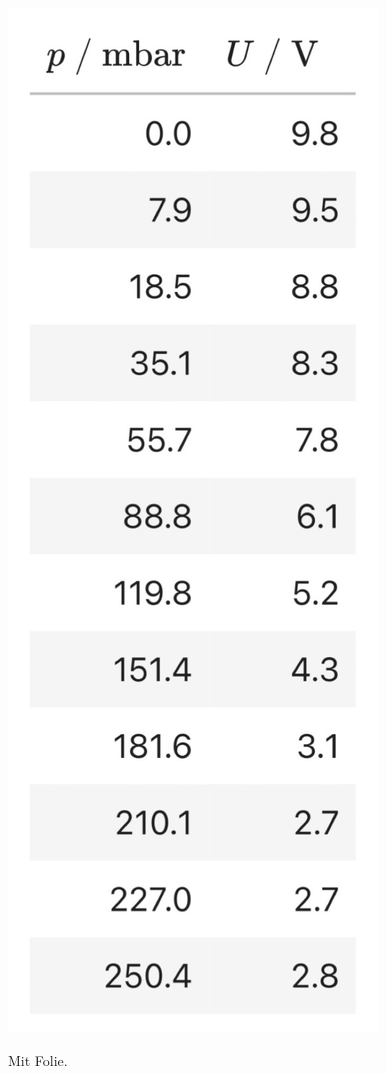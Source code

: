 \begin{table}[H]
\begin{subfigure}{0.18\textwidth}
    	\label{tab:OhneFolie}
	\end{subfigure}
	\hfill
	\begin{subfigure}{0.18\textwidth}
    	\centering
    	\caption{Mit Folie.}
    	\includegraphics[width=\textwidth]{content/tabelle/MitFolie.jpg}
    	\label{tab:MitFolie}
	\end{subfigure}
	\hspace{9em}
\end{table}

